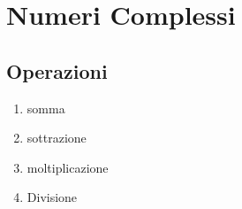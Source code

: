 \section{Numeri Complessi}
\subsection{Operazioni}
\begin{enumerate}
    \item somma
    \item sottrazione
    \item moltiplicazione
    \item {
        Divisione
    }
\end{enumerate}

\lipsum

